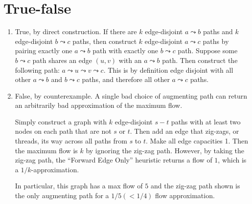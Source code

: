 \documentclass[12pt]{article}
\begin{document}
\newcommand{\braket}[2]{\langle #1|#2 \rangle}
\newcommand{\normtwo}{\frac{1}{\sqrt{2}}}

\section{True-false}

\begin{enumerate}

\item %
True, by direct construction. If there are $k$ edge-disjoint $a\leadsto b$
paths and $k$ edge-disjoint $b \leadsto c$ paths, then construct $k$
edge-disjoint $a\leadsto c$ paths by pairing exactly one $a \leadsto b$
path with exactly one $b \leadsto c$ path. Suppose some $b \leadsto c$ path
shares an edge $(u,v) $ with an $a \leadsto b$ path. Then construct the
following path: $a \leadsto u \leadsto v \leadsto c$. This is by definition
edge disjoint with all other $a \leadsto b$ and $b \leadsto c$ paths,
and therefore all other $a \leadsto c$ paths.

\item %
False, by counterexample. A single bad choice of augmenting path can
return an arbitrarily bad approximation of the maximum flow.

Simply construct a graph with $k$ edge-disjoint $s-t$ paths with
at least two nodes on each path that are not $s$ or $t$. Then
add an edge that zig-zags, or threads, its way across all paths from
$s$ to $t$. Make all edge capacities 1. Then the maximum flow is
$k$ by ignoring the zig-zag path. However, by taking the zig-zag path,
the ``Forward Edge Only'' heuristic returns a flow of $1$,
which is a $1/k$-approximation.

\begin{figure}[hbt]
  
  \centerline{\box\graph}
\end{figure}

In particular, this graph has a max flow of $5$ and the zig-zag path
shown is the only augmenting path for a $1/5 (< 1/4)$ flow approximation.

\end{enumerate}

\pagebreak
\end{document}
